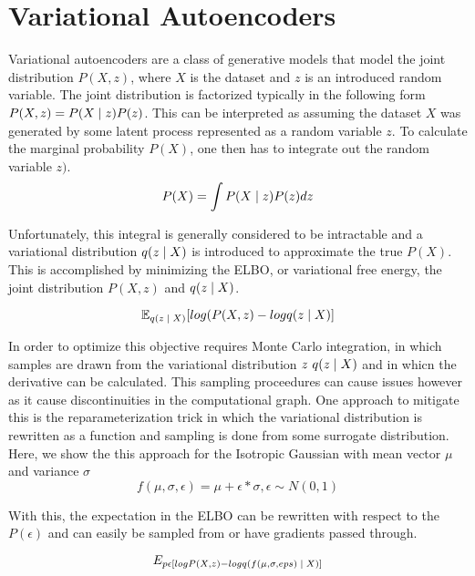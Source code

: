 \section{Variational Autoencoders}

Variational autoencoders are a class of generative models that model the joint distribution $P(X, z)$, where $X$ is the dataset and $z$ is an introduced random variable. The joint distribution is factorized typically in the following form $P(X, z) = P(X\; | \;{z})P(z)$. This can be interpreted as assuming the dataset $X$ was generated by some latent process represented as a random variable $z$. To calculate the marginal probability $P(X)$, one then has to integrate out the random variable $z)$.
\begin{equation}
	P(X) = \int P(X \; | \;{z}) P(z) dz
\end{equation}

Unfortunately, this integral is generally considered to be intractable and a variational distribution $q(z \; | \;{X})$ is introduced to approximate the true $P(X)$. This is accomplished by minimizing the \ac{ELBO}, or variational free energy, the joint distribution $P(X, z)$ and $q(z \; | \;{X})$. 

\begin{equation}
	\operatorname{\mathbb{E}}_{q(z \; | \;{X})} [ log(P(X, z) - log q(z \; | \;{X})] 
\end{equation}


In order to optimize this objective requires Monte Carlo integration, in which samples are drawn from the variational distribution $z ~ q(z \; | \;{X})$ and in whicn the derivative can be calculated. This sampling proceedures can cause issues however as it cause discontinuities in the computational graph. One approach to mitigate this is the reparameterization trick \cite{kingma2014autoencodingVB,rezende2014stochasticBackprop} in which the variational distribution  is rewritten as a function and sampling is done from some surrogate distribution. Here, we show the this approach for the Isotropic Gaussian with mean vector $\mu$ and variance $\sigma$
\begin{equation}
	f(\mu, \sigma, \epsilon) = \mu + \epsilon * \sigma, \epsilon \sim N(0, 1)
\end{equation}

With this, the expectation in the \ac{ELBO} can be rewritten with respect to the $P(\epsilon)$ and can easily be sampled from or have gradients passed through.

\begin{equation}
	E_{p{\epsilon} [ log P(X, z) - log q( f(\mu, \sigma, eps) \; | \;{X})]}
\end{equation}

